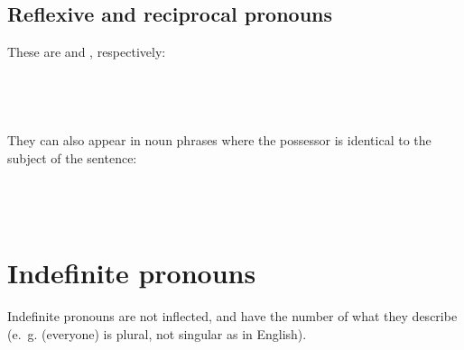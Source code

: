 \documentclass{book}
\begin{document}
\subsection{Reflexive and reciprocal pronouns}

These are  and , respectively: \\
~\\
     \\
     \\
     \\

They can also appear in noun phrases where the possessor is identical to the subject of the sentence: \\
~\\
     \\
     \\
   

\section{Indefinite pronouns}

Indefinite pronouns are not inflected, and have the number of what they describe (e.~g.  (everyone) is plural, not singular as in English).
\end{document}
